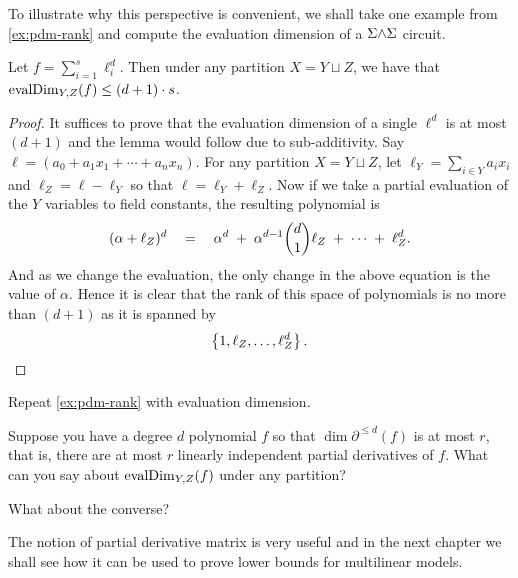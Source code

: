 To illustrate why this perspective is convenient, we shall take one example from \autoref{ex:pdm-rank} and compute the evaluation dimension of a $\Sigma\mathord{\wedge}\Sigma$ circuit. 

\begin{claim}
Let $f = \sum_{i=1}^s \ell_i^d$. Then under any partition $X = Y \sqcup Z$, we have that $\operatorname{evalDim}_{Y,Z}(f) \leq (d+1) \cdot s$. 
\end{claim}
\begin{proof}
  It suffices to prove that the evaluation dimension of a single $\ell^d$ is at most $(d+1)$ and the lemma would follow due to sub-additivity.
Say $\ell = (a_0 + a_1 x_1 + \cdots + a_nx_n)$.
For any partition $X = Y \sqcup Z$, let $\ell_Y = \sum_{i\in Y} a_i x_i$ and $\ell_Z = \ell - \ell_Y$ so that $\ell = \ell_Y + \ell_Z$. Now if we take a partial evaluation of the $Y$ variables to field constants, the resulting polynomial is 
\[
(\alpha + \ell_Z)^d \quad = \quad \alpha^d \;+\; \alpha^{d-1} \binom{d}{1} \ell_Z \;+\; \cdots \;+\; \ell_Z^d. 
\]
And as we change the evaluation, the only change in the above equation is the value of $\alpha$. Hence it is clear that the rank of this space of polynomials is no more than $(d+1)$ as it is spanned by 
\[
\left\{1, \ell_Z, \ldots, \ell_Z^d\right\}.\qedhere
\]
\end{proof}

\begin{exercise}
Repeat \autoref{ex:pdm-rank} with evaluation dimension. 
\end{exercise}

\begin{exercise}
Suppose you have a degree $d$ polynomial $f$ so that $\dim{\partial^{\leq d}(f)}$ is at most $r$, that is, there are at most $r$ linearly independent partial derivatives of $f$. What can you say about $\operatorname{evalDim}_{Y,Z}(f)$ under any partition? 

What about the converse?
\end{exercise}

\bigskip 

The notion of partial derivative matrix is very useful and in the next chapter we shall see how it can be used to prove lower bounds for multilinear models.

